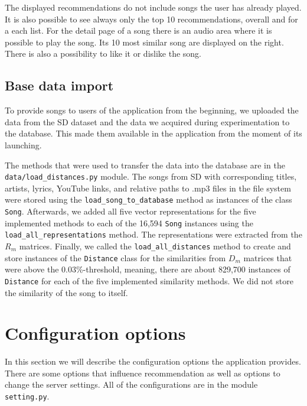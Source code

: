 The displayed recommendations do not include songs the user has already played. It is also possible to see always only the top 10 recommendations, overall and for a each list. For the detail page of a song there is an audio area where it is possible to play the song. Its 10 most similar song are displayed on the right. There is also a possibility to like it or dislike the song.  

\subsection{Base data import}

To provide songs to users of the application from the beginning, we uploaded the data from the SD dataset and the data we acquired during experimentation to the database. This made them available in the application from the moment of its launching. 

The methods that were used to transfer the data into the database are in the \texttt{data/load\_distances.py} module. The songs from SD with corresponding titles, artists, lyrics, YouTube links, and relative paths to .mp3 files in the file system were stored using the \texttt{load\_song\_to\_database} method as instances of the class \texttt{Song}. Afterwards, we added all five vector representations for the five implemented methods to each of the 16,594 \texttt{Song} instances using the \texttt{load\_all\_representations} method. The representations were extracted from the $R_m$ matrices. Finally, we called the \texttt{load\_all\_distances} method to create and store instances of the \texttt{Distance} class for the similarities from $D_m$ matrices that were above the 0.03\%-threshold, meaning, there are about 829,700 instances of \texttt{Distance} for each of the five implemented similarity methods. We did not store the similarity of the song to itself.

\section{Configuration options}\label{sec:configurations}

In this section we will describe the configuration options the application provides. There are some options that influence recommendation as well as options to change the server settings. All of the configurations are in the module \texttt{setting.py}.

